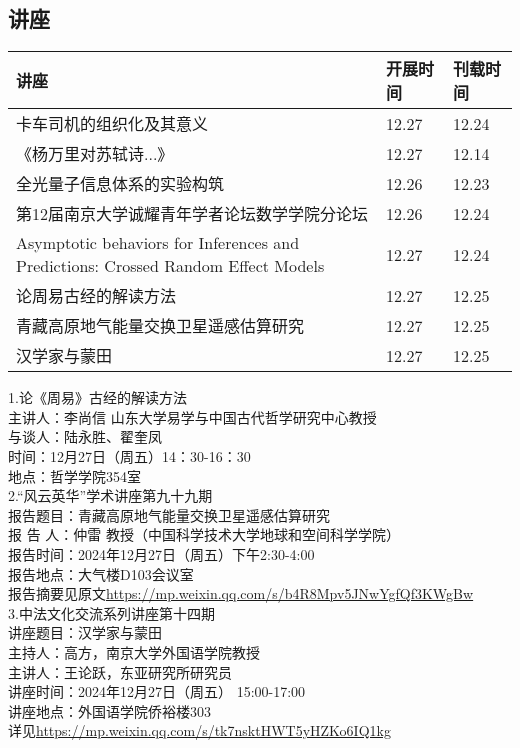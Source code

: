\documentclass[letterpaper, 12pt]{article}
\begin{document}
\begin{multicols}{2}

\section{讲座}
\begin{tabularx}{0.5\textwidth}{|X|X|X|}
    \hline
    讲座 & 开展时间 & 刊载时间\\
    \hline\hline
卡车司机的组织化及其意义 & 12.27 & 12.24\\\hline
《杨万里对苏轼诗...》 & 12.27 & 12.14\\\hline
全光量子信息体系的实验构筑 & 12.26 & 12.23\\\hline
第12届南京大学诚耀青年学者论坛数学学院分论坛 & 12.26 & 12.24\\\hline
Asymptotic behaviors for Inferences and Predictions: Crossed Random Effect Models & 12.27 & 12.24\\\hline
论周易古经的解读方法 & 12.27 & 12.25\\\hline
青藏高原地气能量交换卫星遥感估算研究 & 12.27 & 12.25\\\hline
汉学家与蒙田 & 12.27 & 12.25\\\hline
\end{tabularx}

1.论《周易》古经的解读方法\\
主讲人：李尚信 山东大学易学与中国古代哲学研究中心教授\\
与谈人：陆永胜、翟奎凤\\
时间：12月27日（周五）14：30-16：30\\
地点：哲学学院354室\\

2.“风云英华”学术讲座第九十九期\\
报告题目：青藏高原地气能量交换卫星遥感估算研究\\
报 告 人：仲雷  教授（中国科学技术大学地球和空间科学学院）\\
报告时间：2024年12月27日（周五）下午2:30-4:00\\
报告地点：大气楼D103会议室\\
报告摘要见原文\url{https://mp.weixin.qq.com/s/b4R8Mpv5JNwYgfQf3KWgBw}\\

3.中法文化交流系列讲座第十四期\\
讲座题目：汉学家与蒙田\\
主持人：高方，南京大学外国语学院教授\\
主讲人：王论跃，东亚研究所研究员\\
讲座时间：2024年12月27日（周五） 15:00-17:00\\
讲座地点：外国语学院侨裕楼303\\
详见\url{https://mp.weixin.qq.com/s/tk7nsktHWT5yHZKo6IQ1kg}


\end{multicols}
\end{document}

